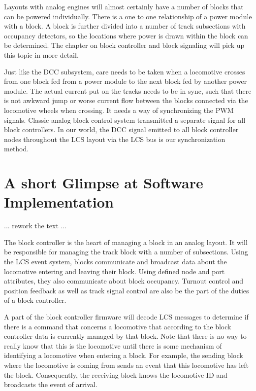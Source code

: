 Layouts with analog engines will almost certainly have a number of blocks that can be powered individually. There is a one to one relationship of a power module with a block. A block is further divided into a number of track subsections with occupancy detectors, so the locations where power is drawn within the block can be determined. The chapter on block controller and block signaling will pick up this topic in more detail.

Just like the DCC subsystem, care needs to be taken when a locomotive crosses from one block fed from a power module to the next block fed by another power module. The actual current put on the tracks needs to be in sync, such that there is not awkward jump or worse current flow between the blocks connected via the locomotive wheels when crossing. It needs a way of synchronizing the PWM signals. Classic analog block control system transmitted a separate signal for all block controllers. In our world, the DCC signal emitted to all block controller nodes throughout the LCS layout via the LCS bus is our synchronization method.

\section{A short Glimpse at Software Implementation}

... rework the text ...

The block controller is the heart of managing a block in an analog layout. It will be responsible for managing the track block with a number of subsections. Using the LCS event system, blocks communicate and broadcast data about the locomotive entering and leaving their block. Using defined node and port attributes, they also communicate about block occupancy. Turnout control and position feedback as well as track signal control are also be the part of the duties of a block controller.

A part of the block controller firmware will decode LCS messages to determine if there is a command that concerns a locomotive that according to the block controller data is currently managed by that block. Note that there is no way to really know that this is the locomotive until there is some mechanism of identifying a locomotive when entering a block. For example, the sending block where the locomotive is coming from sends an event that this locomotive has left the block. Consequently, the receiving block knows the locomotive ID and broadcasts the event of arrival.

